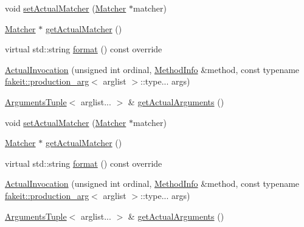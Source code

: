 \begin{DoxyCompactItemize}
void \mbox{\hyperlink{structfakeit_1_1ActualInvocation_abc95cd40eee8560cfcc69f0ab1c23713}{set\+Actual\+Matcher}} (\mbox{\hyperlink{structfakeit_1_1ActualInvocation_1_1Matcher}{Matcher}} $\ast$matcher)
\item 
\mbox{\hyperlink{structfakeit_1_1ActualInvocation_1_1Matcher}{Matcher}} $\ast$ \mbox{\hyperlink{structfakeit_1_1ActualInvocation_a656047cd638d3617bf9038d30aa6808b}{get\+Actual\+Matcher}} ()
\item 
virtual std\+::string \mbox{\hyperlink{structfakeit_1_1ActualInvocation_a84fc89352c4dfc5ff8b24239901f809a}{format}} () const override
\item 
\mbox{\hyperlink{structfakeit_1_1ActualInvocation_a99175c134863f4d8320da8b5fe4bd223}{Actual\+Invocation}} (unsigned int ordinal, \mbox{\hyperlink{structfakeit_1_1MethodInfo}{Method\+Info}} \&method, const typename \mbox{\hyperlink{structfakeit_1_1production__arg}{fakeit\+::production\+\_\+arg}}$<$ arglist $>$\+::type... args)
\item 
\mbox{\hyperlink{namespacefakeit_a476a37a598825e1b5dd67b3a176491a1}{Arguments\+Tuple}}$<$ arglist... $>$ \& \mbox{\hyperlink{structfakeit_1_1ActualInvocation_a90b32ff4f76fa609de50d72792657207}{get\+Actual\+Arguments}} ()
\item 
void \mbox{\hyperlink{structfakeit_1_1ActualInvocation_abc95cd40eee8560cfcc69f0ab1c23713}{set\+Actual\+Matcher}} (\mbox{\hyperlink{structfakeit_1_1ActualInvocation_1_1Matcher}{Matcher}} $\ast$matcher)
\item 
\mbox{\hyperlink{structfakeit_1_1ActualInvocation_1_1Matcher}{Matcher}} $\ast$ \mbox{\hyperlink{structfakeit_1_1ActualInvocation_a656047cd638d3617bf9038d30aa6808b}{get\+Actual\+Matcher}} ()
\item 
virtual std\+::string \mbox{\hyperlink{structfakeit_1_1ActualInvocation_a84fc89352c4dfc5ff8b24239901f809a}{format}} () const override
\item 
\mbox{\hyperlink{structfakeit_1_1ActualInvocation_a99175c134863f4d8320da8b5fe4bd223}{Actual\+Invocation}} (unsigned int ordinal, \mbox{\hyperlink{structfakeit_1_1MethodInfo}{Method\+Info}} \&method, const typename \mbox{\hyperlink{structfakeit_1_1production__arg}{fakeit\+::production\+\_\+arg}}$<$ arglist $>$\+::type... args)
\item 
\mbox{\hyperlink{namespacefakeit_a476a37a598825e1b5dd67b3a176491a1}{Arguments\+Tuple}}$<$ arglist... $>$ \& \mbox{\hyperlink{structfakeit_1_1ActualInvocation_a90b32ff4f76fa609de50d72792657207}{get\+Actual\+Arguments}} ()
\item 

\end{DoxyCompactItemize}
